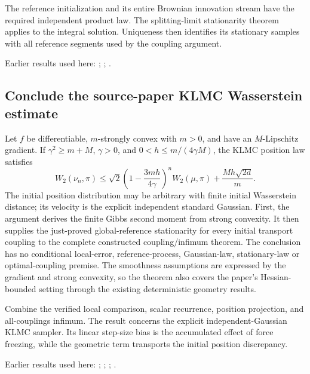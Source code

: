 \documentclass[11pt,a4paper]{report}
\begin{document}
The reference initialization and its entire Brownian innovation stream have the required independent product law. The splitting-limit stationarity theorem applies to the integral solution. Uniqueness then identifies its stationary samples with all reference segments used by the coupling argument.



Earlier results used here: \cite[Section~3.13.2]{LangevinLean2026ULASC}; \cite[Section~3.17.1]{LangevinLean2026ULASC}; \cite[Section~3.26.3]{LangevinLean2026ULASC}.
\subsection{\texorpdfstring{Conclude the source-paper KLMC Wasserstein estimate}{Conclude the source-paper KLMC Wasserstein estimate}}
\label{report-step-KineticLangevin-CanonicalKLMC-lean-2}


Let \(f\) be differentiable, \(m\)-strongly convex with \(m>0\), and have an \(M\)-Lipschitz gradient. If \(\gamma^2\ge m+M\), \(\gamma>0\), and \(0<h\le m/(4\gamma M)\), the KLMC position law satisfies \[W_2(\nu_n,\pi)\le\sqrt2\left(1-\frac{3mh}{4\gamma}\right)^nW_2(\mu,\pi)+\frac{Mh\sqrt{2d}}m.\] The initial position distribution may be arbitrary with finite initial Wasserstein distance; its velocity is the explicit independent standard Gaussian. First, the argument derives the finite Gibbs second moment from strong convexity. It then supplies the just-proved global-reference stationarity for every initial transport coupling to the complete constructed coupling/\allowbreak{}infimum theorem. The conclusion has no conditional local-error, reference-process, Gaussian-law, stationary-law or optimal-coupling premise. The smoothness assumptions are expressed by the gradient and strong convexity, so the theorem also covers the paper's Hessian-bounded setting through the existing deterministic geometry results.



Combine the verified local comparison, scalar recurrence, position projection, and all-couplings infimum. The result concerns the explicit independent-Gaussian KLMC sampler. Its linear step-size bias is the accumulated effect of force freezing, while the geometric term transports the initial position discrepancy.



Earlier results used here: \cite[Section~3.17.3]{LangevinLean2026ULASC}; \cite[Section~3.17.4]{LangevinLean2026ULASC}; \cite[Section~3.26.15]{LangevinLean2026ULASC}; \cite[Section~3.26.3]{LangevinLean2026ULASC}.
\end{document}
